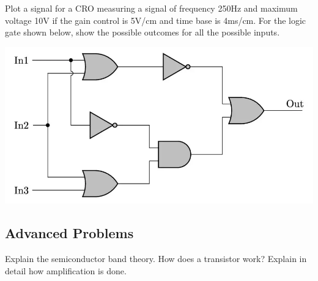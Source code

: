 \documentclass[11pt,addpoints]{exam}
\begin{document}
	\begin{questions}
		\question Plot a signal for a CRO measuring a signal of frequency 250Hz and maximum voltage 10V if the gain control is 5V/cm and time base is 4ms/cm.
		\question For the logic gate shown below, show the possible outcomes for all the possible inputs.
		\begin{center}
			\includegraphics[scale=0.3]{lg1}
		\end{center}
		\subsection*{Advanced Problems}
		\question Explain the semiconductor band theory.
		\question How does a transistor work? Explain in detail how amplification is done.
	\end{questions}		
\end{document}
